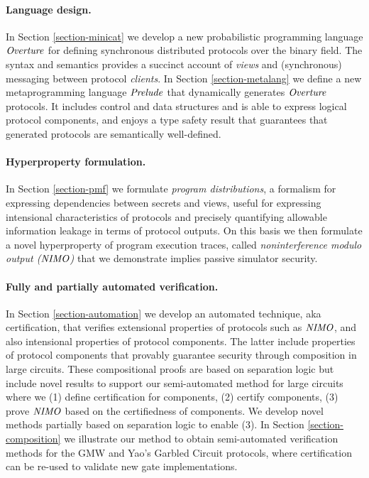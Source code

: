 \paragraph{Language design.} In Section \ref{section-minicat} we
develop a new probabilistic programming language $\mathit{Overture}$ for
defining synchronous distributed protocols over the binary field. The
syntax and semantics provides a succinct account of \emph{views} and
(synchronous) messaging between protocol \emph{clients}. In Section
\ref{section-metalang} we define a new metaprogramming language
$\mathit{Prelude}$ that dynamically generates $\mathit{Overture}$ protocols. It
includes control and data structures and is able to express logical
protocol components, and enjoys a type safety result that guarantees
that generated protocols are semantically well-defined.

\paragraph{Hyperproperty formulation.} In Section \ref{section-pmf} we
formulate \emph{program distributions}, a formalism for expressing
dependencies between secrets and views, useful for expressing
intensional characteristics of protocols and precisely quantifying
allowable information leakage in terms of protocol outputs. On this
basis we then formulate a novel hyperproperty of program execution
traces, called \emph{noninterference modulo output ($\mathit{NIMO}$)} that we
demonstrate implies passive simulator security.

\paragraph{Fully and partially automated verification.} In Section
\ref{section-automation} we develop an automated technique, aka
certification, that verifies extensional properties of protocols such
as $\mathit{NIMO}$, and also intensional properties of protocol
components. The latter include properties of protocol components that
provably guarantee security through composition in large
circuits. These compositional proofs are based on separation logic but
include novel results to support our semi-automated method for large
circuits where we (1) define certification for components, (2) certify
components, (3) prove $\mathit{NIMO}$ based on the certifiedness of
components. We develop novel methods partially based on separation
logic \cite{barthe2019probabilistic} to enable (3).  In Section
\ref{section-composition} we illustrate our method to obtain
semi-automated verification methods for the GMW and Yao's Garbled
Circuit protocols, where certification can be re-used to validate new
gate implementations.
